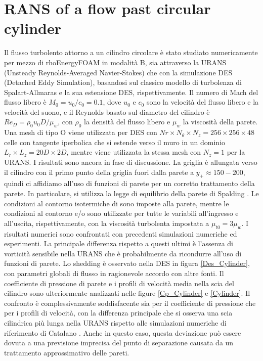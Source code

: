 \documentclass[a5paper]{sapthesis}
\begin{document}
	\section{RANS of a flow past circular cylinder}
	Il flusso turbolento attorno a un cilindro circolare è stato studiato numericamente per mezzo di rhoEnergyFOAM in modalità B, sia attraverso la URANS (Unsteady Reynolds-Averaged Navier-Stokes) che con la simulazione DES (Detached Eddy Simulation), basandosi sul classico modello di turbolenza di Spalart-Allmaras e la sua estensione DES, rispettivamente. Il numero di Mach del flusso libero è $M_0 = u_0 /c_0 = 0.1$, dove $u_0$ e $c_0$ sono la velocità del flusso libero e la velocità del suono, e il Reynolds basato sul diametro del cilindro è $Re_D = \rho_0 u_0 D/ \mu_w$, con $\rho_0$ la densità del flusso libero e $\mu_w$ la viscosità della parete. Una mesh di tipo O viene utilizzata per DES con $Nr \times N_\theta \times N_z = 256 \times 256 \times 48$ celle con tangente iperbolica che si estende verso il muro in un dominio $L_r \times L_z = 20D \times 2D$, mentre viene utilizzata la stessa mesh con $N_z = 1$ per la URANS. I risultati sono ancora in fase di discussione.
	La griglia è allungata verso il cilindro con il primo punto della griglia fuori dalla parete a $y_+ \approx 150 - 200$, quindi ci affidiamo all'uso di funzioni di parete per un corretto trattamento della parete. In particolare, si utilizza la legge di equilibrio della parete di Spalding \citep{spalding1961single}. Le condizioni al contorno isotermiche di  sono imposte alla parete, mentre le condizioni al contorno  e/o  sono utilizzate per tutte le variabili all'ingresso e all'uscita, rispettivamente, con la viscosità turbolenta impostata a $\mu_{t0} = 3\mu_w$. I risultati numerici sono confrontati con precedenti simulazioni numeriche ed esperimenti. La principale differenza rispetto a questi ultimi è l'assenza di vorticità sensibile nella URANS che è probabilmente da ricondurre all'uso di funzioni di parete. Lo shedding è osservato nella DES in figura \ref{Des_Cylinder}, con parametri globali di ﬂusso in ragionevole accordo con altre fonti. Il coefficiente di pressione di parete e i proﬁli di velocità media nella scia del cilindro sono ulteriormente analizzati nelle ﬁgure \ref{Cp_Cylinder} e \ref{Cylinder}. Il confronto è complessivamente soddisfacente sia per il coefficiente di pressione che per i proﬁli di velocità, con la differenza principale che si osserva una scia cilindrica più lunga nella URANS rispetto alle simulazioni numeriche di riferimento di Catalano \citep{Catalano}. Anche in questo caso, questa deviazione può essere dovuta a una previsione imprecisa del punto di separazione causata da un trattamento approssimativo delle pareti.
	
\end{document}
